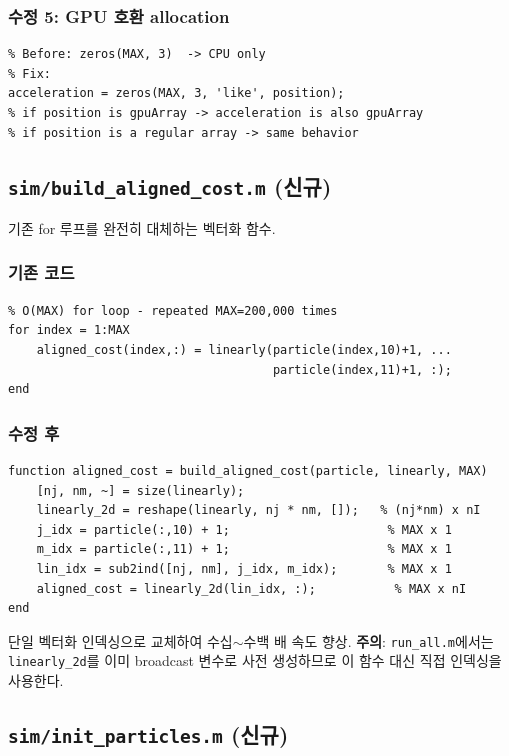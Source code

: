 \documentclass[11pt, a4paper]{article}
\begin{document}
\subsubsection{수정 5: GPU 호환 allocation}

\begin{lstlisting}
% Before: zeros(MAX, 3)  -> CPU only
% Fix:
acceleration = zeros(MAX, 3, 'like', position);
% if position is gpuArray -> acceleration is also gpuArray
% if position is a regular array -> same behavior
\end{lstlisting}

\subsection{\texttt{sim/build\_aligned\_cost.m} (신규)}

기존 for 루프를 완전히 대체하는 벡터화 함수.

\subsubsection{기존 코드}

\begin{lstlisting}
% O(MAX) for loop - repeated MAX=200,000 times
for index = 1:MAX
    aligned_cost(index,:) = linearly(particle(index,10)+1, ...
                                     particle(index,11)+1, :);
end
\end{lstlisting}

\subsubsection{수정 후}

\begin{lstlisting}
function aligned_cost = build_aligned_cost(particle, linearly, MAX)
    [nj, nm, ~] = size(linearly);
    linearly_2d = reshape(linearly, nj * nm, []);   % (nj*nm) x nI
    j_idx = particle(:,10) + 1;                      % MAX x 1
    m_idx = particle(:,11) + 1;                      % MAX x 1
    lin_idx = sub2ind([nj, nm], j_idx, m_idx);       % MAX x 1
    aligned_cost = linearly_2d(lin_idx, :);           % MAX x nI
end
\end{lstlisting}

단일 벡터화 인덱싱으로 교체하여 수십$\sim$수백 배 속도 향상.
\textbf{주의}: \texttt{run\_all.m}에서는 \texttt{linearly\_2d}를 이미 broadcast 변수로
사전 생성하므로 이 함수 대신 직접 인덱싱을 사용한다.

\subsection{\texttt{sim/init\_particles.m} (신규)}
\end{document}
